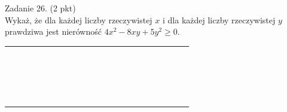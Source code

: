 \documentclass[10pt]{article}
\begin{document}
Zadanie 26. (2 pkt)\\
Wykaż, że dla każdej liczby rzeczywistej \(x\) i dla każdej liczby rzeczywistej \(y\) prawdziwa jest nierówność \(4 x^{2}-8 x y+5 y^{2} \geq 0\).

\begin{center}
\begin{tabular}{|c|c|c|c|c|c|c|c|c|c|c|c|c|c|c|c|c|c|c|c|c|c|}
\hline
 &  &  &  &  &  &  &  &  &  &  &  &  &  &  &  &  &  &  &  &  &  \\
\hline
 &  &  &  &  &  &  &  &  &  &  &  &  &  &  &  &  &  &  &  &  &  \\
\hline
 &  &  &  &  &  &  &  &  &  &  &  &  &  &  &  &  &  &  &  &  &  \\
\hline
 &  &  &  &  &  &  &  &  &  &  &  &  &  &  &  &  &  &  &  &  &  \\
\hline
 &  &  &  &  &  &  &  &  &  &  &  &  &  &  &  &  &  &  &  &  &  \\
\hline
 &  &  &  &  &  &  &  &  &  &  &  &  &  &  &  &  &  &  &  &  &  \\
\hline
 &  &  &  &  &  &  &  &  &  &  &  &  &  &  &  &  &  &  &  &  &  \\
\hline
 &  &  &  &  &  &  &  &  &  &  &  &  &  &  &  &  &  &  &  &  &  \\
\hline
 &  &  &  &  &  &  &  &  &  &  &  &  &  &  &  &  &  &  &  &  &  \\
\hline
 &  &  &  &  &  &  &  &  &  &  &  &  &  &  &  &  &  &  &  &  &  \\
\hline
 &  &  &  &  &  &  &  &  &  &  &  &  &  &  &  &  &  &  &  &  &  \\
\hline
 &  &  &  &  &  &  &  &  &  &  &  &  &  &  &  &  &  &  &  &  &  \\
\hline
 &  &  &  &  &  &  &  &  &  &  &  &  &  &  &  &  &  &  &  &  &  \\
\hline
 &  &  &  &  &  &  &  &  &  &  &  &  &  &  &  &  &  &  &  &  &  \\
\hline
 &  &  &  &  &  &  &  &  &  &  &  &  &  &  &  &  &  &  &  &  &  \\
\hline
 &  &  &  &  &  &  &  &  &  &  &  &  &  &  &  &  &  &  &  &  &  \\
\hline
 &  &  &  &  &  &  &  &  &  &  &  &  &  &  &  &  &  &  &  &  &  \\
\hline
 &  &  &  &  &  &  &  &  &  &  &  &  &  &  &  &  &  &  &  &  &  \\
\hline
 &  &  &  &  &  &  &  &  &  &  &  &  &  &  &  &  &  &  &  &  &  \\
\hline
 &  &  &  &  &  &  &  &  &  &  &  &  &  &  &  &  &  &  &  &  &  \\

\end{tabular}
\end{center}
\end{document}
